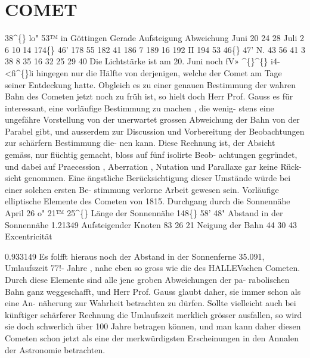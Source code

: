 \documentclass[12pt,a4paper]{article}
\newcommand{\degree}{\textdegree}
\begin{document}
\section*{COMET}
38\textasciicircum\{\} 
lo"  53™ 
in  Göttingen 
Gerade 
Aufsteigung Abweichung 
Juni  20 
24 
28 
Juli     2 
6 
10 
14 
174\degree\{\}  46' 
178     55 
182    41 
186      7 
189     16 
192     II 
194     53 
46\degree\{\}  47'  N. 
43     56 
41       3 
38       8 
35     16 
32     25 
29     40 
Die  Lichtstärke  ist  am  20.  Juni  noch  fV»  \textasciicircum\{\}\textasciicircum\{\}  i4-  <fi\textasciicircum\{\}li  hingegen  nur  die  Hälfte  von  derjenigen, 
welche  der  Comet  am  Tage  seiner  Entdeckung  hatte. 
Obgleich  es  zu  einer  genauen  Bestimmung  der  wahren  Bahn  des  Cometen  jetzt  noch  zu  früh  ist, 
so  hielt  doch  Herr  Prof.  Gauss  es  für  interessant,  eine  vorläufige  Bestimmung  zu  machen  ,  die  wenig- 
stens eine  ungefähre  Vorstellung  von  der  unerwartet  grossen  Abweichung  der  Bahn  von  der  Parabel 
gibt,  und  ausserdem  zur  Discussion  und  Vorbereitung  der  Beobachtungen  zur  schärfern  Bestimmung  die- 
nen kann.  Diese  Rechnung  ist,  der  Absicht  gemäss,  nur  flüchtig  gemacht,  bloss  auf  fünf  isolirte  Beob- 
achtungen gegründet,  und  dabei  auf  Praecession ,  Aberration ,  Nutation  und  Parallaxe  gar  keine  Rück- 
sicht genommen.  Eine  ängstliche  Berücksichtigung  dieser  Umstände  würde  bei  einer  solchen  ersten  Be- 
stimmung verlorne  Arbeit  gewesen  sein. 
Vorläufige  elliptische  Elemente  des  Cometen  von  1815. 
Durchgang  durch  die  Sonnennähe  April  26  o"  21™  25\textasciicircum\{\} 
Länge  der  Sonnennähe   
148\degree\{\}  58'   48" 
Abstand  in  der  Sonnennähe   
1.21349 
Aufsteigender  Knoten   
83     26     21 
Neigung  der  Bahn   
44    30    43 
Excentricität       

0.933149 
Es  folfft  hieraus  noch  der  Abstand  in  der  Sonnenferne  35.091,  Umlaufszeit  77!- Jahre ,  nahe  eben  so  gross 
wie  die  des  HALLEVschen  Cometen.  Durch  diese  Elemente  sind  alle  jene  groben  Abweichungen  der  pa- 
rabolischen Bahn  ganz  weggeschafft,  und  Herr  Prof.  Gauss  glaubt  daher,  sie  immer  schon  als  eine  An- 
näherung zur  Wahrheit  betrachten  zu  dürfen.  Sollte  vielleicht  auch  bei  künftiger  schärferer  Rechnung 
die  Umlaufszeit  merklich  grösser  ausfallen,  so  wird  sie  doch  schwerlich  über  100  Jahre  betragen  können, 
und  man  kann  daher  diesen  Cometen  schon  jetzt  als  eine  der  merkwürdigsten  Erscheinungen  in  den 
Annalen  der  Astronomie  betrachten. 
\end{document}
